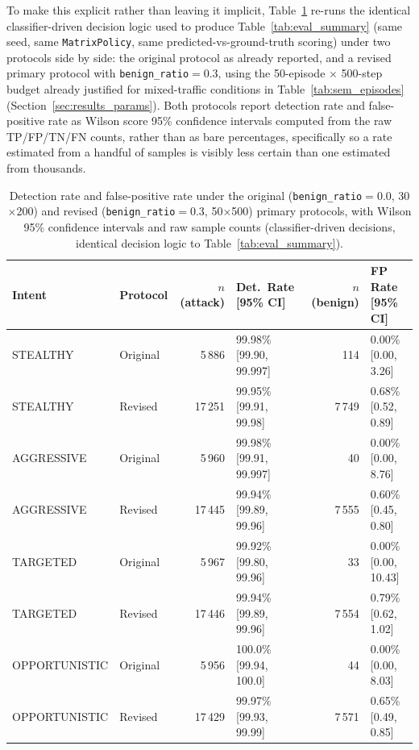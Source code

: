To make this explicit rather than leaving it implicit,
Table~\ref{tab:primary_ci_comparison} re-runs the identical classifier-driven
decision logic used to produce Table~\ref{tab:eval_summary} (same seed, same
\texttt{MatrixPolicy}, same predicted-vs-ground-truth scoring) under two
protocols side by side: the original protocol as already reported, and a
revised primary protocol with \texttt{benign\_ratio}$=0.3$, using the
50-episode $\times$ 500-step budget already justified for mixed-traffic
conditions in Table~\ref{tab:sem_episodes} (Section~\ref{sec:results_params}).
Both protocols report detection rate and false-positive rate as Wilson score
95\% confidence intervals computed from the raw TP/FP/TN/FN counts, rather
than as bare percentages, specifically so a rate estimated from a handful of
samples is visibly less certain than one estimated from thousands.

\begin{table}[htbp]
  \centering
  \small
  \caption{Detection rate and false-positive rate under the original
           (\texttt{benign\_ratio}$=0.0$, 30$\times$200) and revised
           (\texttt{benign\_ratio}$=0.3$, 50$\times$500) primary protocols,
           with Wilson 95\% confidence intervals and raw sample counts
           (classifier-driven decisions, identical decision logic to
           Table~\ref{tab:eval_summary}).}
  \label{tab:primary_ci_comparison}
  \begin{tabular}{llrlrl}
    \toprule
    Intent & Protocol & $n$(attack) & Det.\ Rate [95\% CI] & $n$(benign) & FP Rate [95\% CI] \\
    \midrule
    STEALTHY      & Original & 5\,886  & 99.98\% [99.90, 99.997] & 114   & 0.00\% [0.00, 3.26]  \\
    STEALTHY      & Revised  & 17\,251 & 99.95\% [99.91, 99.98]  & 7\,749 & 0.68\% [0.52, 0.89]  \\
    AGGRESSIVE    & Original & 5\,960  & 99.98\% [99.91, 99.997] & 40    & 0.00\% [0.00, 8.76]  \\
    AGGRESSIVE    & Revised  & 17\,445 & 99.94\% [99.89, 99.96]  & 7\,555 & 0.60\% [0.45, 0.80]  \\
    TARGETED      & Original & 5\,967  & 99.92\% [99.80, 99.96]  & 33    & 0.00\% [0.00, 10.43] \\
    TARGETED      & Revised  & 17\,446 & 99.94\% [99.89, 99.96]  & 7\,554 & 0.79\% [0.62, 1.02]  \\
    OPPORTUNISTIC & Original & 5\,956  & 100.0\% [99.94, 100.0]  & 44    & 0.00\% [0.00, 8.03]  \\
    OPPORTUNISTIC & Revised  & 17\,429 & 99.97\% [99.93, 99.99]  & 7\,571 & 0.65\% [0.49, 0.85]  \\
    \bottomrule
  \end{tabular}
\end{table}

